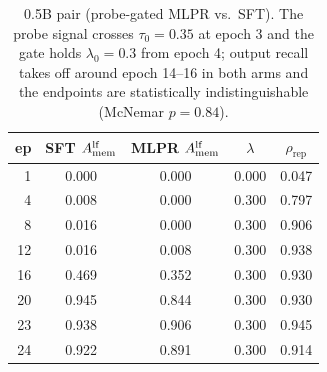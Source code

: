 \begin{table}[h]
\centering
\scriptsize
\setlength{\tabcolsep}{3.6pt}
\begin{tabular*}{\columnwidth}{@{\extracolsep{\fill}} r cccc}
\toprule
ep & SFT $A_{\mathrm{mem}}^{\mathrm{lf}}$ & MLPR $A_{\mathrm{mem}}^{\mathrm{lf}}$ & $\lambda$ & $\rho_{\mathrm{rep}}$ \\
\midrule
1 & 0.000 & 0.000 & 0.000 & 0.047 \\
4 & 0.008 & 0.000 & 0.300 & 0.797 \\
8 & 0.016 & 0.000 & 0.300 & 0.906 \\
12 & 0.016 & 0.008 & 0.300 & 0.938 \\
16 & 0.469 & 0.352 & 0.300 & 0.930 \\
20 & 0.945 & 0.844 & 0.300 & 0.930 \\
23 & 0.938 & 0.906 & 0.300 & 0.945 \\
24 & 0.922 & 0.891 & 0.300 & 0.914 \\
\bottomrule
\end{tabular*}
\caption{0.5B pair (probe-gated MLPR vs.\ SFT). The probe signal
crosses $\tau_0{=}0.35$ at epoch 3 and the gate holds
$\lambda_0{=}0.3$ from epoch 4; output recall takes off around epoch
14--16 in both arms and the endpoints are statistically
indistinguishable (McNemar $p{=}0.84$).}
\label{tab:curves05}
\end{table}

